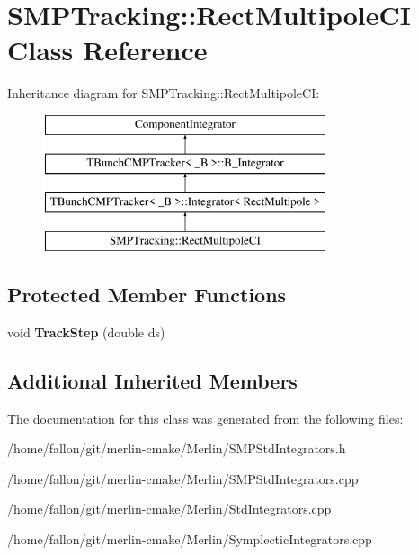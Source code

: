 \hypertarget{classSMPTracking_1_1RectMultipoleCI}{}\section{S\+M\+P\+Tracking\+:\+:Rect\+Multipole\+CI Class Reference}
\label{classSMPTracking_1_1RectMultipoleCI}
Inheritance diagram for S\+M\+P\+Tracking\+:\+:Rect\+Multipole\+CI\+:\begin{figure}[H]
\begin{center}
\leavevmode
\includegraphics[height=4.000000cm]{classSMPTracking_1_1RectMultipoleCI}
\end{center}
\end{figure}
\subsection*{Protected Member Functions}
\begin{DoxyCompactItemize}
\item 
\mbox{\label{classSMPTracking_1_1RectMultipoleCI_a9a71af00a0b4cd19d9fd874cc0414363}} 
void {\bfseries Track\+Step} (double ds)
\end{DoxyCompactItemize}
\subsection*{Additional Inherited Members}


The documentation for this class was generated from the following files\+:\begin{DoxyCompactItemize}
\item 
/home/fallon/git/merlin-\/cmake/\+Merlin/S\+M\+P\+Std\+Integrators.\+h\item 
/home/fallon/git/merlin-\/cmake/\+Merlin/S\+M\+P\+Std\+Integrators.\+cpp\item 
/home/fallon/git/merlin-\/cmake/\+Merlin/Std\+Integrators.\+cpp\item 
/home/fallon/git/merlin-\/cmake/\+Merlin/Symplectic\+Integrators.\+cpp\end{DoxyCompactItemize}
